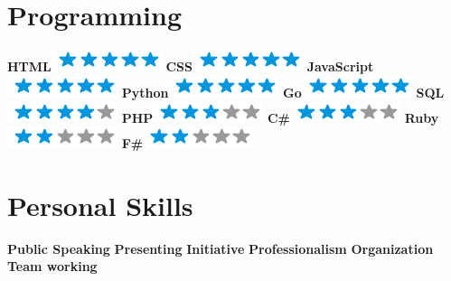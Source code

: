 \documentclass[]{friggeri-cv}
\begin{document}
\begin{aside}
  \section{Programming}
    \textbf{HTML}\includegraphics[scale=0.40]{img/5stars.png}
    \textbf{CSS}\includegraphics[scale=0.40]{img/5stars.png}
    \textbf{JavaScript}\includegraphics[scale=0.40]{img/5stars.png}
    \textbf{Python}\includegraphics[scale=0.40]{img/5stars.png}
    \textbf{Go}\includegraphics[scale=0.40]{img/5stars.png}
     \textbf{SQL}\includegraphics[scale=0.40]{img/4stars.png}
     \textbf{PHP}\includegraphics[scale=0.40]{img/3stars.png}
     \textbf{C\#}\includegraphics[scale=0.40]{img/3stars.png}
     \textbf{Ruby}\includegraphics[scale=0.40]{img/2stars.png}
     \textbf{F\#}\includegraphics[scale=0.40]{img/2stars.png}
    ~
  \section{Personal Skills}
    \textbf{Public Speaking}
    \textbf{Presenting}
    \textbf{Initiative}
    \textbf{Professionalism}
    \textbf{Organization}
    \textbf{Team working}
    ~
\end{aside}
\end{document}
